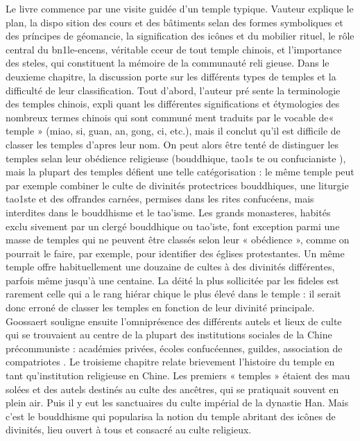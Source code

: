 Le livre commence par une visite guidée d'un temple typique. Vauteur explique le plan, la dispo  sition des cours et des bâtiments selan des formes symboliques et des príncipes de géomancie, la signification des icônes et du mobilier rituel, le rôle central du bn1le-encens, véritable cceur de tout temple chinois, et l'importance des steles, qui constituent la mémoire de la communauté reli  gieuse.
Dans le deuxieme chapitre, la discussion porte sur les différents types de temples et la difficulté de leur classification. Tout d'abord, l'auteur pré  sente la terminologie des temples chinois, expli  quant les différentes significations et étymologies des nombreux termes chinois qui sont communé  ment traduits par le vocable de« temple » (miao, si, guan, an, gong, ci, etc.), mais il conclut qu'il est difficile de classer les temples d'apres leur nom. On peut alors être tenté de distinguer les temples selan leur obédience religieuse (bouddhique, tao1s  te ou confucianiste ), mais la plupart des temples défient une telle catégorisation : le même temple peut par exemple combiner le culte de divinités protectrices bouddhiques, une liturgie tao1ste et des offrandes carnées, permises dans les rites confucéens, mais interdites dans le bouddhisme et
le tao'isme. Les grands monasteres, habités exclu  sivement par un clergé bouddhique ou tao'iste, font exception parmi une masse de temples qui ne peuvent être classés selon leur « obédience », comme on pourrait le faire, par exemple, pour identifier des églises protestantes. Un même temple offre habituellement une douzaine de cultes à des divinités différentes, parfois même jusqu'à une centaine. La déité la plus sollicitée par les fideles est rarement celle qui a le rang hiérar  chique le plus élevé dans le temple : il serait donc erroné de classer les temples en fonction de leur divinité principale. Goossaert souligne ensuite l'omniprésence des différents autels et lieux de culte qui se trouvaient au centre de la plupart des institutions sociales de la Chine précommuniste : académies privées, écoles confucéennes, guildes, association de compatriotes .
Le troisieme chapitre relate brievement l'histoire du temple en tant qu'institution religieuse en Chine. Les premiers « temples » étaient des mau  solées et des autels destinés au culte des ancêtres, qui se pratiquait souvent en plein air. Puis il y eut les sanctuaires du culte impérial de la dynastie Han. Mais c'est le bouddhisme qui popularisa la notion du temple abritant des icônes de divinités, lieu ouvert à tous et consacré au culte religieux.

